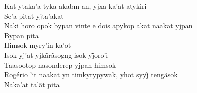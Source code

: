 \begin{linenumbers}
 
\noindent   Kat ytaka'a tyka akabm an, yjxa ka'at atykiri\\
  Se'a pitat yjta'akat\\
  Naki horo opok bypan vinte e dois apykop akat naakat yjpan\\
  Bypan pita\\
  Himsok myry'in ka'ot\\
  Isok yj’at yjkãrãsogng isok yj̃oro’i\\
  Taasootop nasonderep yjpan himsok\\
  Rogério ’it naakat yn timkyrypywak, yhot syyj̃ tengãsok\\
  Naka'at ta'ãt pita
 
\end{linenumbers}

\bigskip

